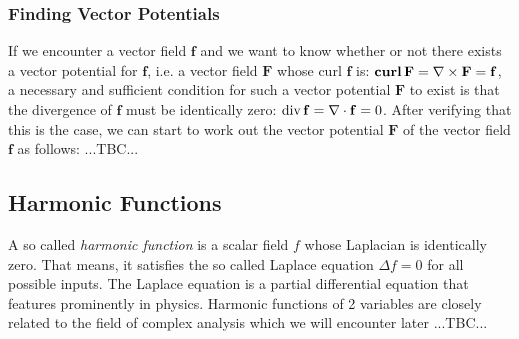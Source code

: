 
\subsubsection{Finding Vector Potentials}
If we encounter a vector field $\mathbf{f}$ and we want to know whether or not there exists a vector potential for $\mathbf{f}$, i.e. a vector field $\mathbf{F}$ whose curl $\mathbf{f}$ is: $\operatorname{\mathbf{curl}} \mathbf{F} = \nabla \times \mathbf{F} = \mathbf{f}$, a necessary and sufficient condition for such a vector potential $\mathbf{F}$ to exist is that the divergence of $\mathbf{f}$ must be identically zero: $\operatorname{div} \mathbf{f} = \nabla \cdot \mathbf{f} = 0$. After verifying that this is the case, we can start to work out the vector potential $\mathbf{F}$ of the vector field $\mathbf{f}$ as follows: ...TBC...






\subsection{Harmonic Functions}
A so called \emph{harmonic function} is a scalar field $f$ whose Laplacian is identically zero. That means, it satisfies the so called Laplace equation $\Delta f = 0$ for all possible inputs. The Laplace equation is a partial differential equation that features prominently in physics. Harmonic functions of 2 variables are closely related to the field of complex analysis which we will encounter later ...TBC...


